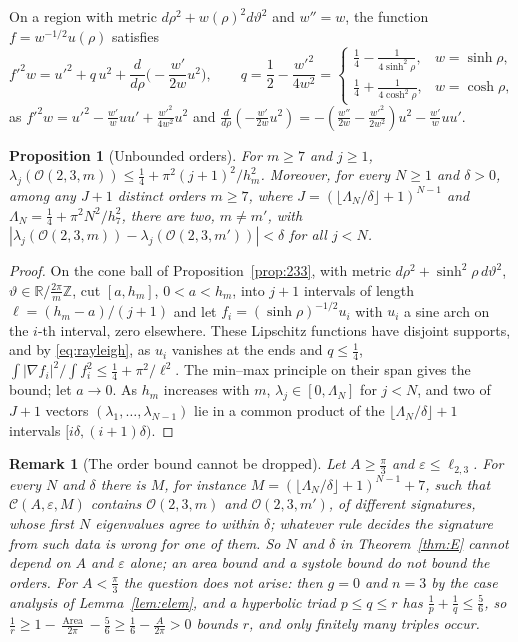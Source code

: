 \documentclass[pdflatex,sn-mathphys-num]{sn-jnl}
\theoremstyle{thmstyleone}%
\newtheorem{proposition}[theorem]{Proposition}%
\theoremstyle{thmstylethree}%
\newtheorem{remark}[theorem]{Remark}%
\newcommand{\Orb}{\mathcal{O}}
\newcommand{\Cl}{\mathcal{C}}
\newcommand{\Area}{\operatorname{Area}}
\newcommand{\R}{\mathbb{R}}
\newcommand{\Z}{\mathbb{Z}}
\begin{document}
On a region with metric $d\rho^2+w(\rho)^2d\vartheta^2$ and $w''=w$, the function $f=w^{-1/2}u(\rho)$ satisfies
\begin{equation}\label{eq:rayleigh}
  f'^2w=u'^2+q\,u^2+\frac d{d\rho}\Big(-\frac{w'}{2w}u^2\Big),\qquad q=\frac12-\frac{w'^2}{4w^2}=\begin{cases}\frac14-\frac1{4\sinh^2\rho},&w=\sinh\rho,\\\frac14+\frac1{4\cosh^2\rho},&w=\cosh\rho,\end{cases}
\end{equation}
as $f'^2w=u'^2-\frac{w'}wuu'+\frac{w'^2}{4w^2}u^2$ and $\frac d{d\rho}(-\frac{w'}{2w}u^2)=-(\frac{w''}{2w}-\frac{w'^2}{2w^2})u^2-\frac{w'}wuu'$.

\begin{proposition}[Unbounded orders]\label{prop:N1}
For $m\ge7$ and $j\ge1$, $\lambda_j(\Orb(2,3,m))\le\frac14+\pi^2(j+1)^2/h_m^2$. Moreover, for every $N\ge1$ and $\delta>0$, among any $J+1$ distinct orders $m\ge7$, where $J=(\lfloor\Lambda_N/\delta\rfloor+1)^{N-1}$ and $\Lambda_N=\frac14+\pi^2N^2/h_7^2$, there are two, $m\ne m'$, with $|\lambda_j(\Orb(2,3,m))-\lambda_j(\Orb(2,3,m'))|<\delta$ for all $j<N$.
\end{proposition}

\begin{proof}
On the cone ball of Proposition~\ref{prop:233}, with metric $d\rho^2+\sinh^2\rho\,d\vartheta^2$, $\vartheta\in\R/\frac{2\pi}m\Z$, cut $[a,h_m]$, $0<a<h_m$, into $j+1$ intervals of length $\ell=(h_m-a)/(j+1)$ and let $f_i=(\sinh\rho)^{-1/2}u_i$ with $u_i$ a sine arch on the $i$-th interval, zero elsewhere. These Lipschitz functions have disjoint supports, and by \eqref{eq:rayleigh}, as $u_i$ vanishes at the ends and $q\le\frac14$, $\int|\nabla f_i|^2/\int f_i^2\le\frac14+\pi^2/\ell^2$. The min--max principle on their span gives the bound; let $a\to0$. As $h_m$ increases with $m$, $\lambda_j\in[0,\Lambda_N]$ for $j<N$, and two of $J+1$ vectors $(\lambda_1,\dots,\lambda_{N-1})$ lie in a common product of the $\lfloor\Lambda_N/\delta\rfloor+1$ intervals $[i\delta,(i+1)\delta)$.
\end{proof}

\begin{remark}[The order bound cannot be dropped]\label{rem:Mneeded}
Let $A\ge\frac\pi3$ and $\varepsilon\le\ell_{2,3}$. For every $N$ and $\delta$ there is $M$, for instance $M=(\lfloor\Lambda_N/\delta\rfloor+1)^{N-1}+7$, such that $\Cl(A,\varepsilon,M)$ contains $\Orb(2,3,m)$ and $\Orb(2,3,m')$, of different signatures, whose first $N$ eigenvalues agree to within $\delta$; whatever rule decides the signature from such data is wrong for one of them. So $N$ and $\delta$ in Theorem~\ref{thm:E} cannot depend on $A$ and $\varepsilon$ alone; an area bound and a systole bound do not bound the orders. For $A<\frac\pi3$ the question does not arise: then $g=0$ and $n=3$ by the case analysis of Lemma~\ref{lem:elem}, and a hyperbolic triad $p\le q\le r$ has $\frac1p+\frac1q\le\frac56$, so $\frac1r\ge1-\frac{\Area}{2\pi}-\frac56\ge\frac16-\frac A{2\pi}>0$ bounds $r$, and only finitely many triples occur.
\end{remark}
\end{document}
